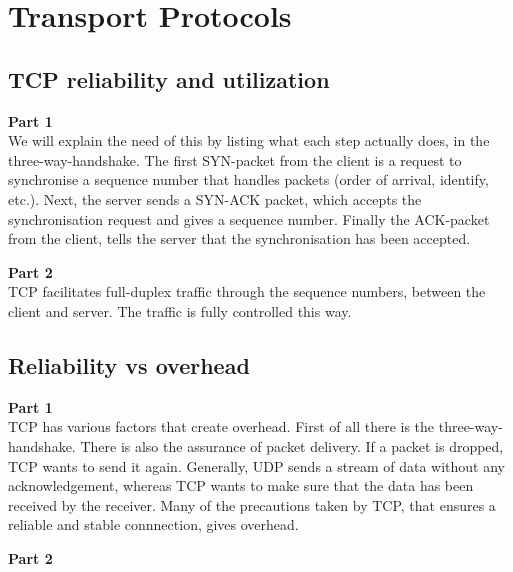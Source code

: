\section{Transport Protocols}
\subsection{TCP reliability and utilization}
\textbf{Part 1} \\
We will explain the need of this by listing what each step actually does, in the
three-way-handshake. The first SYN-packet from the client is a request to
synchronise a sequence number that handles packets (order of arrival, identify,
etc.). Next, the server sends a SYN-ACK packet, which accepts the synchronisation
request and gives a sequence number. Finally the ACK-packet from the client,
tells the server that the synchronisation has been accepted.

\noindent \textbf{Part 2} \\
TCP facilitates full-duplex traffic through the sequence numbers, between the
client and server. The traffic is fully controlled this way.

\subsection{Reliability vs overhead}
\textbf{Part 1} \\
TCP has various factors that create overhead. First of all there is the
three-way-handshake. There is also the assurance of packet delivery. If a
packet is dropped, TCP wants to send it again. Generally, UDP sends a stream of
data without any acknowledgement, whereas TCP wants to make sure that the data
has been received by the receiver. Many of the precautions taken by TCP, that
ensures a reliable and stable connnection, gives overhead.

\noindent \textbf{Part 2}

